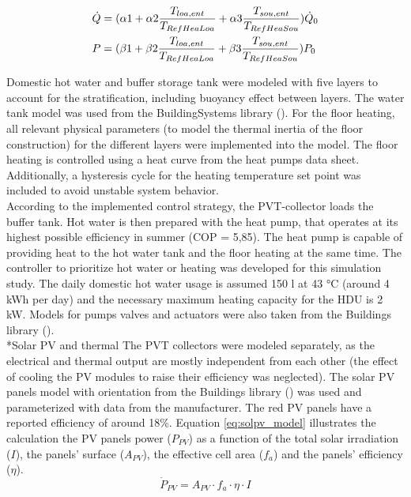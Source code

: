 \documentclass[twocolumn, a4paper,10pt]{article}
\makeatletter
\renewcommand\subsection{\@startsection{subsection}{1}{\z@}{\z@}{\z@}{\normalfont\normalsize\bfseries}}
\renewcommand\subsection{\@startsection{subsection}{1}{\z@}{\z@}{0.1pt}{\normalfont\normalsize\bfseries}}
\makeatother
\begin{document}
\begin{equation}
\begin{aligned}
\vspace{-3pt}
    &\dot{Q} = (\alpha1 + \alpha2 \frac{T_{loa,ent}}{T_{RefHeaLoa}} + \alpha3 \frac{T_{sou,ent}}{T_{RefHeaSou}}) \dot{Q}_0 \\
    &P= (\beta1 + \beta2 \frac{T_{loa,ent}}{T_{RefHeaLoa}} + \beta3 \frac{T_{sou,ent}}{T_{RefHeaSou}}) P_0
\label{eq:HPmodel}
\end{aligned}
\end{equation}

Domestic hot water and buffer storage tank were modeled with five layers to account for the stratification, including buoyancy effect between layers. The water tank model was used from the BuildingSystems library (\citet{NytschGeusen2012}). For the floor heating, all relevant physical parameters (to model the thermal inertia of the floor construction) for the different layers were implemented into the model. The floor heating is controlled using a heat curve from the heat pumps data sheet. Additionally, a hysteresis cycle for the heating temperature set point was included to avoid unstable system behavior.\\
According to the implemented control strategy, the PVT-collector loads the buffer tank. Hot water is then prepared with the heat pump, that operates at its highest possible efficiency in summer (COP = 5,85). The heat pump is capable of providing heat to the hot water tank and the floor heating at the same time. The controller to prioritize hot water or heating was developed for this simulation study. The daily domestic hot water usage is assumed 150 l at 43 °C (around 4 kWh per day) and the necessary maximum heating capacity for the HDU is 2 kW. Models for pumps valves and actuators were also taken from the Buildings library (\citet{Wetter2014}).\\

\subsection*{Solar PV and thermal}
The PVT collectors were modeled separately, as the electrical and thermal output are mostly independent from each other (the effect of cooling the PV modules to raise their efficiency was neglected). The solar PV panels model with orientation from the Buildings library (\citet{Wetter2014}) was used and parameterized with data from the manufacturer. The red PV panels have a reported efficiency of around 18\%. Equation \ref{eq:solpv_model} illustrates the calculation the PV panels power ($P_{PV}$) as a function of the total solar irradiation ($I$), the panels' surface ($A_{PV}$), the effective cell area ($f_a$) and the panels' efficiency ($\eta$).\\
\vspace{-1pt}
\begin{equation}
\dot{P}_{PV} = A_{PV} \cdot  f_{a} \cdot \eta \cdot I
\label{eq:solpv_model}
\end{equation}
\end{document}

